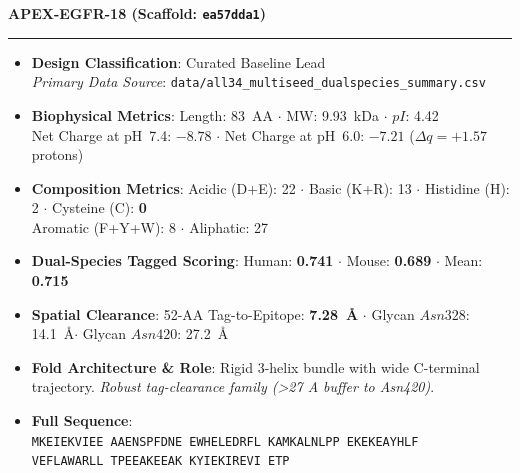 \documentclass[11pt]{article}
\begin{document}
\noindent\textbf{\color{navyblue}\large APEX-EGFR-18  \quad (Scaffold: \texttt{ea57dda1})} \\
\vspace{-0.4em}
\rule{\textwidth}{0.6pt}
\vspace{-0.2em}
\begin{itemize}
  \setlength{\itemsep}{2pt}
  \setlength{\parskip}{0pt}
  \item \textbf{Design Classification}: Curated Baseline Lead \\
    \textit{Primary Data Source}: \texttt{\small data/all34\_multiseed\_dualspecies\_summary.csv}
  \item \textbf{Biophysical Metrics}: Length: 83~AA $\cdot$ MW: 9.93~kDa $\cdot$ $pI$: 4.42 \\
    Net Charge at pH~7.4: $-8.78$ $\cdot$ Net Charge at pH~6.0: $-7.21$ ($\Delta q = +1.57$ protons)
  \item \textbf{Composition Metrics}: Acidic (D+E): 22 $\cdot$ Basic (K+R): 13 $\cdot$ Histidine (H): 2 $\cdot$ Cysteine (C): \textbf{0} \\
    Aromatic (F+Y+W): 8 $\cdot$ Aliphatic: 27
  \item \textbf{Dual-Species Tagged Scoring}: Human: \textbf{0.741} $\cdot$ Mouse: \textbf{0.689} $\cdot$ Mean: \textbf{0.715}
  \item \textbf{Spatial Clearance}: 52-AA Tag-to-Epitope: \textbf{7.28~\AA} $\cdot$ Glycan $Asn328$: 14.1~\AA $\cdot$ Glycan $Asn420$: 27.2~\AA
  \item \textbf{Fold Architecture \& Role}: Rigid 3-helix bundle with wide C-terminal trajectory. \textit{Robust tag-clearance family (>27 A buffer to Asn420)}.
  \item \textbf{Full Sequence}: \\
    \texttt{\small MKEIEKVIEE AAENSPFDNE EWHELEDRFL KAMKALNLPP EKEKEAYHLF \\
    VEFLAWARLL TPEEAKEEAK KYIEKIREVI ETP}
\end{itemize}
\vspace{0.8em}
\end{document}
